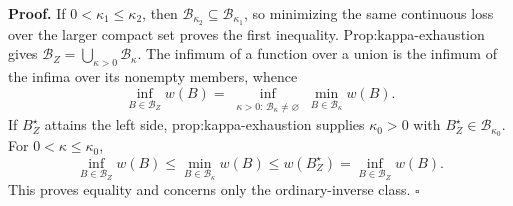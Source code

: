 \textbf{Proof.}
If \(0<\kappa_1\le\kappa_2\), then \(\mathcal B_{\kappa_2}\subseteq\mathcal B_{\kappa_1}\), so minimizing the same continuous loss over the larger compact set proves the first inequality.  Prop:kappa-exhaustion gives \(\mathcal B_Z=\bigcup_{\kappa>0}\mathcal B_\kappa\).  The infimum of a function over a union is the infimum of the infima over its nonempty members, whence
\[
 \inf_{B\in\mathcal B_Z}w(B)
 =\inf_{\substack{\kappa>0:\,\mathcal B_\kappa\ne\varnothing}}
 \min_{B\in\mathcal B_\kappa}w(B).
\]
If \(B_Z^\star\) attains the left side, prop:kappa-exhaustion supplies \(\kappa_0>0\) with \(B_Z^\star\in\mathcal B_{\kappa_0}\).  For \(0<\kappa\le\kappa_0\),
\[
 \inf_{B\in\mathcal B_Z}w(B)
 \le\min_{B\in\mathcal B_\kappa}w(B)
 \le w(B_Z^\star)
 =\inf_{B\in\mathcal B_Z}w(B).
\]
This proves equality and concerns only the ordinary-inverse class. \(\square\)